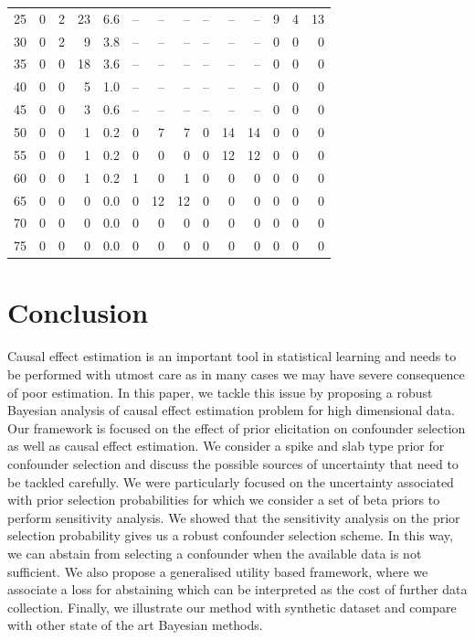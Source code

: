 \documentclass[preprint,12pt]{elsarticle}
\begin{document}
\begin{table}[ht]
\begin{tabular}{|c||rrr|r||rr|r||rr|r||rr|r|}
25 &   0 &   2 &  23 & 6.6 & -- & -- & -- & -- & -- & -- &   9 &   4 & 13\\ 
  30 &   0 &   2 &   9 & 3.8 & -- & -- & -- & -- & -- & -- &   0 &   0 & 0 \\ 
  35 &   0 &   0 &  18 & 3.6 & -- & -- & -- & -- & -- & -- &   0 &   0 & 0 \\ 
  40 &   0 &   0 &   5 & 1.0 &-- & -- & -- & -- & -- & -- &   0 &   0 & 0 \\ 
  45 &   0 &   0 &   3 & 0.6 & -- & -- & -- & -- & -- & -- &   0 &   0 & 0 \\ 
  50 &   0 &   0 &   1 & 0.2 &  0 &   7 & 7 &   0 &  14 & 14 &   0 &   0 & 0 \\ 
  55 &   0 &   0 &   1 & 0.2 &  0 &   0 & 0 &  0 &  12 & 12 &  0 &   0 & 0 \\ 
  60 &   0 &   0 &   1 & 0.2 &  1 &   0 & 1 &  0 &   0 &  0 & 0 &  0 &   0 \\ 
  65 &   0 &   0 &   0 & 0.0 &  0 &  12 & 12 &  0 &   0 &  0 & 0 &  0 &   0 \\ 
  70 &   0 &   0 &   0 & 0.0 &  0 &   0 &  0 &  0 &   0 &  0 & 0 &  0 &   0 \\ 
  75 &   0 &   0 &   0 & 0.0 &  0 &   0 &  0 &  0 &   0 &  0 & 0 &  0 &   0 \\ 
   \hline
\end{tabular}
\end{table}

\section{Conclusion}\label{sec:conc}

Causal effect estimation is an important tool in statistical learning and needs to
be performed with utmost care as in many cases we may have severe consequence of poor estimation.
In this paper, we tackle this issue by proposing a robust Bayesian analysis of causal 
effect estimation problem for high dimensional data. Our 
framework is focused on the effect of prior elicitation on confounder selection
as well as causal effect estimation. We consider a spike and slab type
prior for confounder selection and discuss the possible sources of uncertainty that
need to be tackled carefully. We were particularly focused on the uncertainty associated
with prior selection probabilities for which we consider a set of beta priors to perform
sensitivity analysis. We showed that the sensitivity analysis on the prior selection probability
gives us a robust confounder selection scheme. In this way, we can abstain from selecting
a confounder when the available data is not sufficient. We also propose a generalised
utility based framework, where we associate a loss for abstaining which can be interpreted 
as the cost of further data collection. Finally, we illustrate our method with synthetic dataset
and compare with other state of the art Bayesian methods. 
\end{document}
